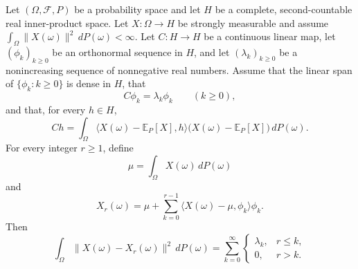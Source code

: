 \begin{theorem}
Let $(\Omega,\mathcal F,P)$ be a probability space and let $H$ be a
complete, second-countable real inner-product space.  Let
$X:\Omega\to H$ be strongly measurable and assume
$\int_\Omega\|X(\omega)\|^2\,dP(\omega)<\infty$.  Let
$C:H\to H$ be a continuous linear map, let $(\phi_k)_{k\ge0}$ be an
orthonormal sequence in $H$, and let $(\lambda_k)_{k\ge0}$ be a
nonincreasing sequence of nonnegative real numbers.  Assume that the linear
span of $\{\phi_k:k\ge0\}$ is dense in $H$, that
\[
  C\phi_k=\lambda_k\phi_k\qquad(k\ge0),
\]
and that, for every $h\in H$,
\[
  Ch=\int_\Omega
  \langle X(\omega)-\mathbb E_P[X],h\rangle
  \bigl(X(\omega)-\mathbb E_P[X]\bigr)\,dP(\omega).
\]
For every integer $r\ge1$, define
\[
  \mu=\int_\Omega X(\omega)\,dP(\omega)
\]
and
\[
  X_r(\omega)=\mu+
  \sum_{k=0}^{r-1}\langle X(\omega)-\mu,\phi_k\rangle\phi_k.
\]
Then
\[
  \int_\Omega\|X(\omega)-X_r(\omega)\|^2\,dP(\omega)
  =\sum_{k=0}^\infty
    \begin{cases}\lambda_k,&r\le k,\\0,&r>k.\end{cases}
\]
\end{theorem}
